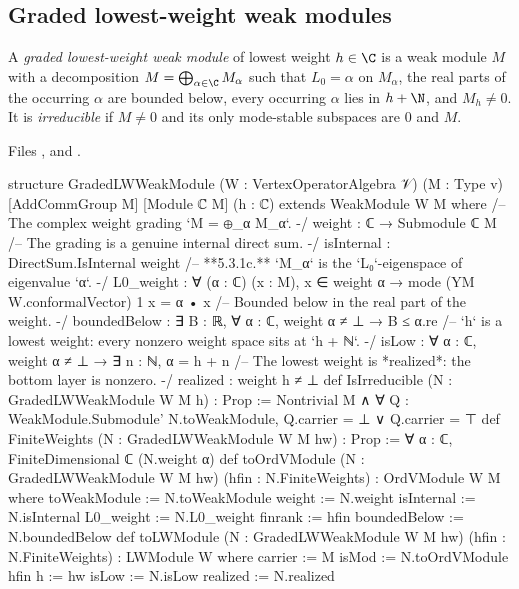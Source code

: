 \subsection{Graded lowest-weight weak modules}

\begin{definition}\label{l13:def:gradedlw}
A \emph{graded lowest-weight weak module} of lowest weight $h\in\C$ is a weak module $M$ with a decomposition
$M = \bigoplus_{\alpha\in\C}M_\alpha$ such that $L_0 = \alpha$ on $M_\alpha$, the real parts of the occurring $\alpha$ are bounded
below, every occurring $\alpha$ lies in $h+\N$, and $M_h\neq0$. It is \emph{irreducible} if $M\neq0$ and its only
mode-stable subspaces are $0$ and $M$.
\end{definition}
\noindent Files ,
 and
.
\begin{leancode}
structure GradedLWWeakModule (W : VertexOperatorAlgebra 𝒱) (M : Type v) [AddCommGroup M]
    [Module ℂ M] (h : ℂ) extends WeakModule W M where
  /-- The complex weight grading `M = ⊕_α M_α`. -/
  weight : ℂ → Submodule ℂ M
  /-- The grading is a genuine internal direct sum. -/
  isInternal : DirectSum.IsInternal weight
  /-- **5.3.1c.** `M_α` is the `L₀`-eigenspace of eigenvalue `α`. -/
  L0_weight : ∀ (α : ℂ) (x : M), x ∈ weight α → mode (YM W.conformalVector) 1 x = α • x
  /-- Bounded below in the real part of the weight. -/
  boundedBelow : ∃ B : ℝ, ∀ α : ℂ, weight α ≠ ⊥ → B ≤ α.re
  /-- `h` is a lowest weight: every nonzero weight space sits at `h + ℕ`. -/
  isLow : ∀ α : ℂ, weight α ≠ ⊥ → ∃ n : ℕ, α = h + n
  /-- The lowest weight is *realized*: the bottom layer is nonzero. -/
  realized : weight h ≠ ⊥
def IsIrreducible (N : GradedLWWeakModule W M h) : Prop :=
  Nontrivial M ∧ ∀ Q : WeakModule.Submodule' N.toWeakModule, Q.carrier = ⊥ ∨ Q.carrier = ⊤
def FiniteWeights (N : GradedLWWeakModule W M hw) : Prop :=
  ∀ α : ℂ, FiniteDimensional ℂ (N.weight α)
def toOrdVModule (N : GradedLWWeakModule W M hw) (hfin : N.FiniteWeights) : OrdVModule W M where
  toWeakModule := N.toWeakModule
  weight := N.weight
  isInternal := N.isInternal
  L0_weight := N.L0_weight
  finrank := hfin
  boundedBelow := N.boundedBelow
def toLWModule (N : GradedLWWeakModule W M hw) (hfin : N.FiniteWeights) : LWModule W where
  carrier := M
  isMod := N.toOrdVModule hfin
  h := hw
  isLow := N.isLow
  realized := N.realized
\end{leancode}

